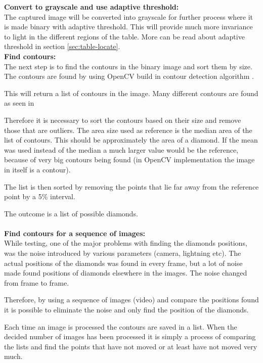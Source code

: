 
\textbf{Convert to grayscale and use adaptive threshold:}\\
The captured image will be converted into grayscale for further process where it is made binary with adaptive threshold. This will provide much more invariance to light in the different regions of the table. More can be read about adaptive threshold in section \ref{sec:table-locate}.\\

\textbf{Find contours:}\\
The next step is to find the contours in the binary image and sort them by size. The contours are found by using OpenCV build in contour detection algorithm \cite{contour}.

This will return a list of contours in the image. Many different contours are found as seen in %

Therefore it is necessary to sort the contours based on their size and remove those that are outliers. The area size used as reference is the median area of the list of contours. This should be approximately the area of a diamond. If the mean was used instead of the median a much larger value would be the reference, because of very big contours being found (in OpenCV implementation the image in itself is a contour).


The list is then sorted by removing the points that lie far away from the reference point by a 5\% interval. 

The outcome is a list of possible diamonds.\\\\

\textbf{Find contours for a sequence of images:}\\
While testing, one of the major problems with finding the diamonds positions, was the noise introduced by various parameters (camera, lightning etc). The actual positions of the diamonds was found in every frame, but a lot of noise made found positions of diamonds elsewhere in the images. 
The noise changed from frame to frame.

Therefore, by using a sequence of images (video) and compare the positions found it is possible to eliminate the noise and only find the position of the diamonds.

Each time an image is processed the contours are saved in a list. When the decided number of images has been processed it is simply a process of comparing the lists and find the points that have not moved or at least have not moved very much.\\

